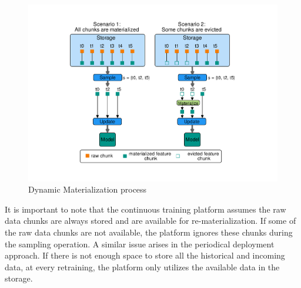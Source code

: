 \begin{figure}[h]
\centering
\includegraphics[width=\columnwidth]{../images/dynamic-materialization.pdf}
 \vspace{-20pt}
\caption{Dynamic Materialization process}
 \vspace{-10pt}
\label{fig:dynamic-materialization-process}
\end{figure}
It is important to note that the continuous training platform assumes the raw data chunks are always stored and are available for re-materialization.
If some of the raw data chunks are not available, the platform ignores these chunks during the sampling operation.
A similar issue arises in the periodical deployment approach.
If there is not enough space to store all the historical and incoming data, at every retraining, the platform only utilizes the available data in the storage.

